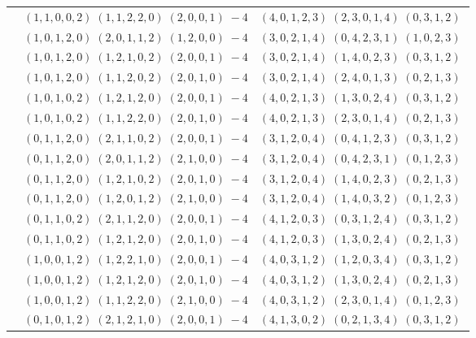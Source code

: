 \documentclass[11pt]{article}
\begin{document}
\begin{longtable}[l]{|c|c|c|}
 \cline{2-3} 
 & $(1 ,1 ,0 ,0 ,2) \;(1 ,1 ,2 ,2 ,0) \;(2 ,0 ,0 ,1) \;-4$ & $(4 ,0 ,1 ,2 ,3) \;(2 ,3 ,0 ,1 ,4) \;(0 ,3 ,1 ,2) \;$\\ 
 \cline{2-3} 
 & $(1 ,0 ,1 ,2 ,0) \;(2 ,0 ,1 ,1 ,2) \;(1 ,2 ,0 ,0) \;-4$ & $(3 ,0 ,2 ,1 ,4) \;(0 ,4 ,2 ,3 ,1) \;(1 ,0 ,2 ,3) \;$\\ 
 \cline{2-3} 
 & $(1 ,0 ,1 ,2 ,0) \;(1 ,2 ,1 ,0 ,2) \;(2 ,0 ,0 ,1) \;-4$ & $(3 ,0 ,2 ,1 ,4) \;(1 ,4 ,0 ,2 ,3) \;(0 ,3 ,1 ,2) \;$\\ 
 \cline{2-3} 
 & $(1 ,0 ,1 ,2 ,0) \;(1 ,1 ,2 ,0 ,2) \;(2 ,0 ,1 ,0) \;-4$ & $(3 ,0 ,2 ,1 ,4) \;(2 ,4 ,0 ,1 ,3) \;(0 ,2 ,1 ,3) \;$\\ 
 \cline{2-3} 
 & $(1 ,0 ,1 ,0 ,2) \;(1 ,2 ,1 ,2 ,0) \;(2 ,0 ,0 ,1) \;-4$ & $(4 ,0 ,2 ,1 ,3) \;(1 ,3 ,0 ,2 ,4) \;(0 ,3 ,1 ,2) \;$\\ 
 \cline{2-3} 
 & $(1 ,0 ,1 ,0 ,2) \;(1 ,1 ,2 ,2 ,0) \;(2 ,0 ,1 ,0) \;-4$ & $(4 ,0 ,2 ,1 ,3) \;(2 ,3 ,0 ,1 ,4) \;(0 ,2 ,1 ,3) \;$\\ 
 \cline{2-3} 
 & $(0 ,1 ,1 ,2 ,0) \;(2 ,1 ,1 ,0 ,2) \;(2 ,0 ,0 ,1) \;-4$ & $(3 ,1 ,2 ,0 ,4) \;(0 ,4 ,1 ,2 ,3) \;(0 ,3 ,1 ,2) \;$\\ 
 \cline{2-3} 
 & $(0 ,1 ,1 ,2 ,0) \;(2 ,0 ,1 ,1 ,2) \;(2 ,1 ,0 ,0) \;-4$ & $(3 ,1 ,2 ,0 ,4) \;(0 ,4 ,2 ,3 ,1) \;(0 ,1 ,2 ,3) \;$\\ 
 \cline{2-3} 
 & $(0 ,1 ,1 ,2 ,0) \;(1 ,2 ,1 ,0 ,2) \;(2 ,0 ,1 ,0) \;-4$ & $(3 ,1 ,2 ,0 ,4) \;(1 ,4 ,0 ,2 ,3) \;(0 ,2 ,1 ,3) \;$\\ 
 \cline{2-3} 
 & $(0 ,1 ,1 ,2 ,0) \;(1 ,2 ,0 ,1 ,2) \;(2 ,1 ,0 ,0) \;-4$ & $(3 ,1 ,2 ,0 ,4) \;(1 ,4 ,0 ,3 ,2) \;(0 ,1 ,2 ,3) \;$\\ 
 \cline{2-3} 
 & $(0 ,1 ,1 ,0 ,2) \;(2 ,1 ,1 ,2 ,0) \;(2 ,0 ,0 ,1) \;-4$ & $(4 ,1 ,2 ,0 ,3) \;(0 ,3 ,1 ,2 ,4) \;(0 ,3 ,1 ,2) \;$\\ 
 \cline{2-3} 
 & $(0 ,1 ,1 ,0 ,2) \;(1 ,2 ,1 ,2 ,0) \;(2 ,0 ,1 ,0) \;-4$ & $(4 ,1 ,2 ,0 ,3) \;(1 ,3 ,0 ,2 ,4) \;(0 ,2 ,1 ,3) \;$\\ 
 \cline{2-3} 
 & $(1 ,0 ,0 ,1 ,2) \;(1 ,2 ,2 ,1 ,0) \;(2 ,0 ,0 ,1) \;-4$ & $(4 ,0 ,3 ,1 ,2) \;(1 ,2 ,0 ,3 ,4) \;(0 ,3 ,1 ,2) \;$\\ 
 \cline{2-3} 
 & $(1 ,0 ,0 ,1 ,2) \;(1 ,2 ,1 ,2 ,0) \;(2 ,0 ,1 ,0) \;-4$ & $(4 ,0 ,3 ,1 ,2) \;(1 ,3 ,0 ,2 ,4) \;(0 ,2 ,1 ,3) \;$\\ 
 \cline{2-3} 
 & $(1 ,0 ,0 ,1 ,2) \;(1 ,1 ,2 ,2 ,0) \;(2 ,1 ,0 ,0) \;-4$ & $(4 ,0 ,3 ,1 ,2) \;(2 ,3 ,0 ,1 ,4) \;(0 ,1 ,2 ,3) \;$\\ 
 \cline{2-3} 
 & $(0 ,1 ,0 ,1 ,2) \;(2 ,1 ,2 ,1 ,0) \;(2 ,0 ,0 ,1) \;-4$ & $(4 ,1 ,3 ,0 ,2) \;(0 ,2 ,1 ,3 ,4) \;(0 ,3 ,1 ,2) \;$\\ 

\end{longtable}
\end{document}
